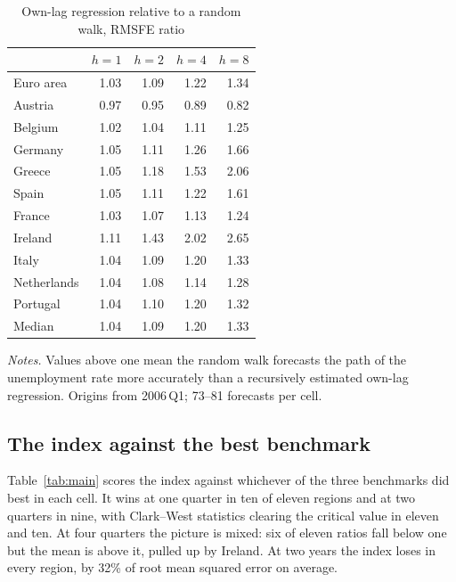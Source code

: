 \documentclass[12pt]{article}
\begin{document}
\begin{table}[htbp]
\centering
\caption{Own-lag regression relative to a random walk, RMSFE ratio}
\label{tab:bench}
\begin{tabular}{lrrrr}
\toprule
& $h{=}1$ & $h{=}2$ & $h{=}4$ & $h{=}8$ \\
\midrule
Euro area   & 1.03 & 1.09 & 1.22 & 1.34 \\
Austria     & 0.97 & 0.95 & 0.89 & 0.82 \\
Belgium     & 1.02 & 1.04 & 1.11 & 1.25 \\
Germany     & 1.05 & 1.11 & 1.26 & 1.66 \\
Greece      & 1.05 & 1.18 & 1.53 & 2.06 \\
Spain       & 1.05 & 1.11 & 1.22 & 1.61 \\
France      & 1.03 & 1.07 & 1.13 & 1.24 \\
Ireland     & 1.11 & 1.43 & 2.02 & 2.65 \\
Italy       & 1.04 & 1.09 & 1.20 & 1.33 \\
Netherlands & 1.04 & 1.08 & 1.14 & 1.28 \\
Portugal    & 1.04 & 1.10 & 1.20 & 1.32 \\
\midrule
Median      & 1.04 & 1.09 & 1.20 & 1.33 \\
\bottomrule
\end{tabular}

\vspace{0.5em}
\begin{minipage}{0.9\textwidth}
\footnotesize \textit{Notes.} Values above one mean the random walk forecasts
the path of the unemployment rate more accurately than a recursively estimated
own-lag regression. Origins from 2006\,Q1; 73--81 forecasts per cell.
\end{minipage}
\end{table}

\subsection{The index against the best benchmark}

Table~\ref{tab:main} scores the index against whichever of the three benchmarks
did best in each cell. It wins at one quarter in ten of eleven regions and at
two quarters in nine, with Clark--West statistics clearing the critical value
in eleven and ten. At four quarters the picture is mixed: six of eleven ratios
fall below one but the mean is above it, pulled up by Ireland. At two years the
index loses in every region, by 32\% of root mean squared error on average.
\end{document}
